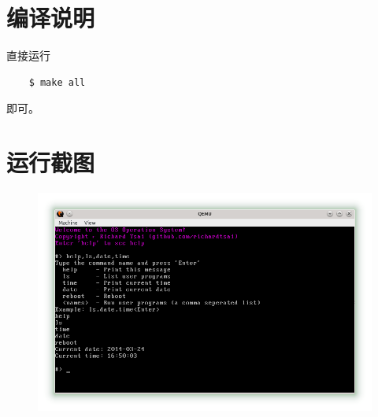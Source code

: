\documentclass[adobefonts, a4paper]{ctexart}
\begin{document}
\section{编译说明}
直接运行

\begin{verbatim}
    $ make all
\end{verbatim}

即可。

\section{运行截图}

\begin{figure}[htp!]
    \center\includegraphics[scale=0.75]{demo}
\end{figure}
\end{document}
